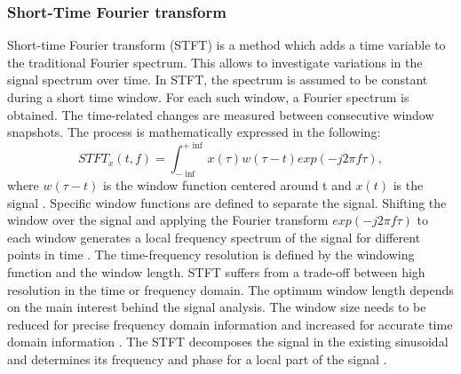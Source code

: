 \subsubsection{Short-Time Fourier transform}
Short-time Fourier transform (STFT) is a method which adds a time variable to the traditional Fourier spectrum. This allows to investigate variations in the signal spectrum over time. In STFT, the spectrum is assumed to be constant during a short time window. For each such window, a Fourier spectrum is obtained. The time-related changes are measured between consecutive window snapshots. The process is mathematically expressed in the following: 
\begin{equation}
    STFT_{x}(t,f) = \int_{- \inf}^{+ \inf}x(\tau) w(\tau -t) exp(-j2\pi f \tau),
\end{equation}
where $w(\tau -t)$ is the window function centered around t and $x(t)$ is the signal \cite{FENG2013}. Specific window functions are defined to separate the signal. Shifting the window over the signal and applying the Fourier transform $exp(-j2\pi f \tau)$ to each window generates a local frequency spectrum of the signal for different points in time \cite{FENG2013}. The time-frequency resolution is defined by the windowing function and the window length. STFT suffers from a trade-off between high resolution in the time or frequency domain. The optimum window length depends on the main interest behind the signal analysis. The window size needs to be reduced for precise frequency domain information and increased for accurate time domain information \cite{Hlawatsch1992}. The STFT decomposes the signal in the existing sinusoidal and determines its frequency and phase for a local part of the signal \cite{Hlawatsch1992}. 

